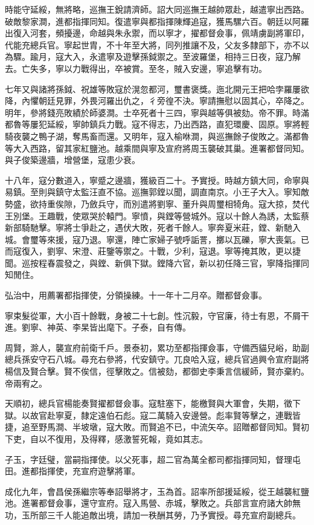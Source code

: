 \begin{pinyinscope}
時能守延綏，無將略，巡撫王銳請濟師。詔大同巡撫王越帥眾赴，越遣寧出西路。破敵黎家澗，進都指揮同知。復遣寧與都指揮陳輝追寇，獲馬騾六百。朝廷以阿羅出復入河套，頻擾邊，命越與朱永禦，而以寧才，擢都督僉事，佩靖虜副將軍印，代能充總兵官。寧起世胄，不十年至大將，同列推讓不及，父友多隸部下，亦不以為驟。踰月，寇大入，永遣寧及遊擊孫鉞禦之。至波羅堡，相持三日夜，寇乃解去。亡失多，寧以力戰得出，卒被賞。至冬，賊入安邊，寧追擊有功。

七年又與諸將孫鉞、祝雄等敗寇於滉忽都河，璽書褒獎。迤北開元王把哈孛羅屢欲降，內懼朝廷見罪，外畏河羅出仇之，彳旁徨不決。寧請撫慰以固其心，卒降之。明年，參將錢亮敗績於師婆澗。士卒死者十三四，寧與越等俱被劾。帝不罪。時滿都魯等屢犯延綏，寧帥鎮兵力戰。寇不得志，乃出西路，直犯環慶、固原。寧將輕騎夜襲之鴨子湖，奪馬畜而還。又明年，寇入榆咻澗，與巡撫餘子俊敗之。滿都魯等大入西路，留其家紅鹽池。越乘間與寧及宣府將周玉襲破其巢。進署都督同知。與子俊築邊牆，增營堡，寇患少衰。

十八年，寇分數道入，寧蹙之邊牆，獲級百二十。予實授。時越方鎮大同，命寧與易鎮。至則與鎮守太監汪直不協。巡撫郭鏜以聞，調直南京。小王子大入。寧知敵勢盛，欲持重俟隙，乃斂兵守，而別遣將劉寧、董升與周璽相犄角。寇大掠，焚代王別堡。王趣戰，使眾哭於轅門。寧憤，與鏜等營城外。寇以十餘人為誘，太監蔡新部騎馳擊。寧將士爭赴之，遇伏大敗，死者千餘人。寧奔夏米莊，鏜、新馳入城。會璽等來援，寇乃退。寧還，陣亡家婦子號呼詬詈，擲以瓦礫，寧大喪氣。已而寇復入，劉寧、宋澄、莊鑒等禦之。十戰，少利，寇退。寧等掩其敗，更以捷聞。巡按程春震發之，與鏜、新俱下獄。鏜降六官，新以初任降三官，寧降指揮同知閒住。

弘治中，用薦署都指揮使，分領操練。十一年十二月卒。贈都督僉事。

寧束髮從軍，大小百十餘戰，身被二十七創。性沉毅，守官廉，待士有恩，不屑干進。劉寧、神英、李杲皆出麾下。子泰，自有傳。

周賢，滁人，襲宣府前衛千戶。景泰初，累功至都指揮僉事，守備西貓兒峪，助副總兵孫安守石八城。尋充右參將，代安鎮守。兀良哈入寇，總兵官過興令宣府副將楊信及賢合擊。賢不俟信，徑擊敗之。信被劾，都御史李秉言信緩師，賢亦棄約。帝兩宥之。

天順初，總兵官楊能奏賢擢都督僉事。寇駐塞下，能檄賢與大軍會，失期，徵下獄。以故官赴寧夏，隸定遠伯石彪。寇二萬騎入安邊營。彪率賢等擊之，連戰皆捷，追至野馬澗、半坡墩，寇大敗。而賢追不已，中流矢卒。詔贈都督同知。賢初下吏，自以不復用，及得釋，感激誓死報，竟如其志。

子玉，字廷璧，當嗣指揮使。以父死事，超二官為萬全都司都指揮同知，督理屯田。進都指揮使，充宣府遊擊將軍。

成化九年，會昌侯孫繼宗等奉詔舉將才，玉為首。詔率所部援延綏，從王越襲紅鹽池。進署都督僉事，還守宣府。寇入馬營、赤城，擊敗之。兵部言宣府諸大帥無功，玉所部三千人能追敵出境，請加一秩酬其勞，乃予實授。尋充宣府副總兵。


\end{pinyinscope}

